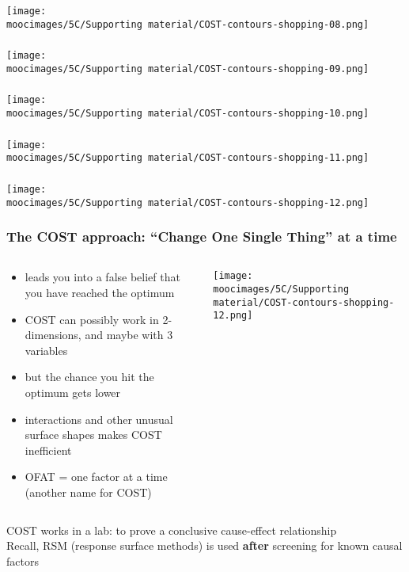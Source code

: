 \documentclass[handout,11pt,aspectratio=169,mathserif]{beamer}
\begin{document}
\begin{frame}\frametitle{}
	\centerline{\texttt{[image: \\moocimages/5C/Supporting material/COST-contours-shopping-08.png]}}
\end{frame}
\begin{frame}\frametitle{}
	\centerline{\texttt{[image: \\moocimages/5C/Supporting material/COST-contours-shopping-09.png]}}
\end{frame}
\begin{frame}\frametitle{}
	\centerline{\texttt{[image: \\moocimages/5C/Supporting material/COST-contours-shopping-10.png]}}
\end{frame}
\begin{frame}\frametitle{}
	\centerline{\texttt{[image: \\moocimages/5C/Supporting material/COST-contours-shopping-11.png]}}
\end{frame}
\begin{frame}\frametitle{}
	\centerline{\texttt{[image: \\moocimages/5C/Supporting material/COST-contours-shopping-12.png]}}
\end{frame}

\begin{frame}\frametitle{The COST approach: {\color{myGreen}``Change One Single Thing'' at a time}}
	\begin{columns}[b]
			\begin{exampleblock}{}
				\begin{itemize}
					\item	leads you into a false belief that you have reached the optimum \pause
					\item	COST can possibly work in 2-dimensions, and maybe with 3 variables
					\item	but the chance you hit the optimum gets lower \pause
					\item	interactions and other unusual surface shapes makes COST inefficient \pause
					
					\item	OFAT = one factor at a time \\(another name for COST)
				\end{itemize}
			\end{exampleblock}
		
			\centerline{\texttt{[image: \\moocimages/5C/Supporting material/COST-contours-shopping-12.png]}}
	\end{columns}
	
	\pause
	\vspace{1cm}
	{\color{myOrange}COST works in a lab: to prove a conclusive cause-effect relationship}
	\\
	\pause
	\vspace{0.5cm}
	{\color{blue} Recall, RSM {\small (response surface methods)} is used \textbf{after} screening for known causal factors}

\end{frame}
\end{document}
